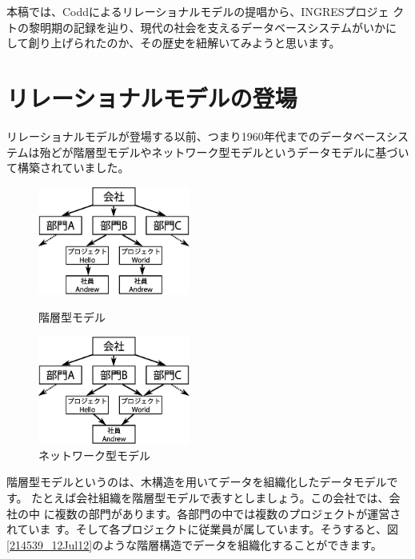 本稿では、Coddによるリレーショナルモデルの提唱から、INGRESプロジェ
クトの黎明期の記録を辿り、現代の社会を支えるデータベースシステムがいかに
して創り上げられたのか、その歴史を紐解いてみようと思います。


\section{リレーショナルモデルの登場}


リレーショナルモデルが登場する以前、つまり1960年代までのデータベースシス
テムは殆どが階層型モデルやネットワーク型モデルというデータモデルに基づい
て構築されていました。


\begin{figure}[tb]
 \begin{minipage}{0.48\textwidth}
  \begin{center}
   \includegraphics[width=5cm]{hayamiz/images/hierarchical-data-model.eps}
   \caption{階層型モデル}
   \label{214539_12Jul12}
  \end{center}
 \end{minipage}
 \begin{minipage}{0.48\textwidth}
  \begin{center}
   \includegraphics[width=5cm]{hayamiz/images/network-data-model.eps}
   \caption{ネットワーク型モデル}
   \label{214707_12Jul12}
  \end{center}
 \end{minipage}
\end{figure}


階層型モデルというのは、木構造を用いてデータを組織化したデータモデルです。
たとえば会社組織を階層型モデルで表すとしましょう。この会社では、会社の中
に複数の部門があります。各部門の中では複数のプロジェクトが運営されていま
す。そして各プロジェクトに従業員が属しています。そうすると、図
\ref{214539_12Jul12}のような階層構造でデータを組織化することができます。



